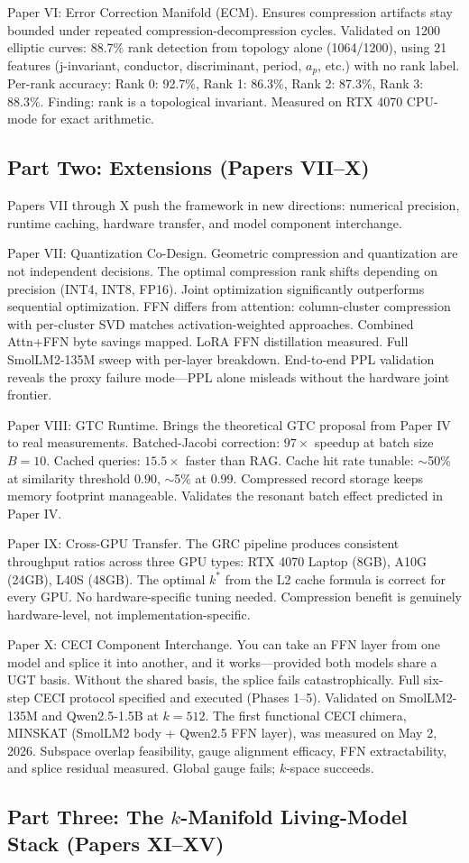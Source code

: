 \documentclass[11pt]{article}
\begin{document}
Paper VI: Error Correction Manifold (ECM). Ensures compression artifacts stay bounded under repeated compression-decompression cycles. Validated on 1200 elliptic curves: 88.7\% rank detection from topology alone (1064/1200), using 21 features (j-invariant, conductor, discriminant, period, $a_p$, etc.) with no rank label. Per-rank accuracy: Rank 0: 92.7\%, Rank 1: 86.3\%, Rank 2: 87.3\%, Rank 3: 88.3\%. Finding: rank is a topological invariant. Measured on RTX 4070 CPU-mode for exact arithmetic.

\subsection*{Part Two: Extensions (Papers VII--X)}

Papers VII through X push the framework in new directions: numerical precision, runtime caching, hardware transfer, and model component interchange.

Paper VII: Quantization Co-Design. Geometric compression and quantization are not independent decisions. The optimal compression rank shifts depending on precision (INT4, INT8, FP16). Joint optimization significantly outperforms sequential optimization. FFN differs from attention: column-cluster compression with per-cluster SVD matches activation-weighted approaches. Combined Attn+FFN byte savings mapped. LoRA FFN distillation measured. Full SmolLM2-135M sweep with per-layer breakdown. End-to-end PPL validation reveals the proxy failure mode---PPL alone misleads without the hardware joint frontier.

Paper VIII: GTC Runtime. Brings the theoretical GTC proposal from Paper IV to real measurements. Batched-Jacobi correction: $97\times$ speedup at batch size $B = 10$. Cached queries: $15.5\times$ faster than RAG. Cache hit rate tunable: $\sim$50\% at similarity threshold 0.90, $\sim$5\% at 0.99. Compressed record storage keeps memory footprint manageable. Validates the resonant batch effect predicted in Paper IV.

Paper IX: Cross-GPU Transfer. The GRC pipeline produces consistent throughput ratios across three GPU types: RTX 4070 Laptop (8GB), A10G (24GB), L40S (48GB). The optimal $k^*$ from the L2 cache formula is correct for every GPU. No hardware-specific tuning needed. Compression benefit is genuinely hardware-level, not implementation-specific.

Paper X: CECI Component Interchange. You can take an FFN layer from one model and splice it into another, and it works---provided both models share a UGT basis. Without the shared basis, the splice fails catastrophically. Full six-step CECI protocol specified and executed (Phases 1--5). Validated on SmolLM2-135M and Qwen2.5-1.5B at $k = 512$. The first functional CECI chimera, MINSKAT (SmolLM2 body + Qwen2.5 FFN layer), was measured on May 2, 2026. Subspace overlap feasibility, gauge alignment efficacy, FFN extractability, and splice residual measured. Global gauge fails; $k$-space succeeds. \subsection*{Part Three: The $k$-Manifold Living-Model Stack (Papers XI--XV)}
\end{document}
